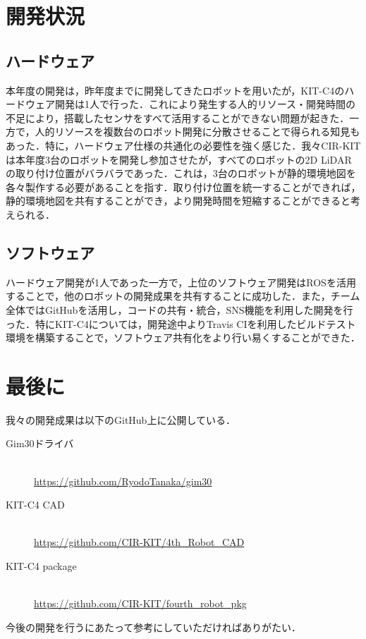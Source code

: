 \documentclass[10pt,a4paper]{jarticle}
\begin{document}
\section{開発状況}
\subsection{ハードウェア}
本年度の開発は，昨年度までに開発してきたロボットを用いたが，KIT-C4のハードウェア開発は1人で行った．これにより発生する人的リソース・開発時間の不足により，搭載したセンサをすべて活用することができない問題が起きた．一方で，人的リソースを複数台のロボット開発に分散させることで得られる知見もあった．特に，ハードウェア仕様の共通化の必要性を強く感じた．我々CIR-KITは本年度3台のロボットを開発し参加させたが，すべてのロボットの2D LiDARの取り付け位置がバラバラであった．これは，3台のロボットが静的環境地図を各々製作する必要があることを指す．取り付け位置を統一することができれば，静的環境地図を共有することができ，より開発時間を短縮することができると考えられる．
\subsection{ソフトウェア}
ハードウェア開発が1人であった一方で，上位のソフトウェア開発はROSを活用することで，他のロボットの開発成果を共有することに成功した．また，チーム全体ではGitHubを活用し，コードの共有・統合，SNS機能を利用した開発を行った．特にKIT-C4については，開発途中よりTravis CIを利用したビルドテスト環境を構築することで，ソフトウェア共有化をより行い易くすることができた．

\section{最後に}
我々の開発成果は以下のGitHub上に公開している．
\begin{description}
 \item[Gim30ドライバ]~\\ \url{https://github.com/RyodoTanaka/gim30}
 \item[KIT-C4 CAD]~\\ \url{https://github.com/CIR-KIT/4th_Robot_CAD}
 \item[KIT-C4 package]~\\ \url{https://github.com/CIR-KIT/fourth_robot_pkg}
\end{description}
今後の開発を行うにあたって参考にしていただければありがたい．
\end{document}
